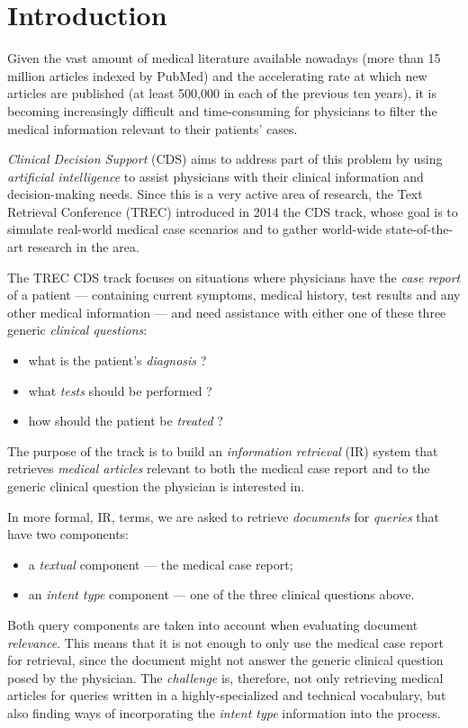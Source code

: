 \chapter{Introduction}
Given the vast amount of medical literature available nowadays (more than 15 million articles indexed by PubMed)
and the accelerating rate at which new articles are published (at least 500,000 in each of the previous ten years),
it is becoming increasingly difficult and time-consuming for physicians to filter the medical information
relevant to their patients' cases.

\emph{Clinical Decision Support} (CDS) aims to address part of this problem by using \emph{artificial intelligence}
to assist physicians with their clinical information and decision-making needs.
Since this is a very active area of research,
the Text Retrieval Conference (TREC)
introduced in 2014 the CDS track,
whose goal is to simulate real-world medical case scenarios and to gather world-wide state-of-the-art research in the area.

The TREC CDS track focuses on situations where physicians have the \emph{case report} of a patient
--- containing current symptoms, medical history, test results and any other medical information ---
and need assistance with either one of these three generic
\emph{clinical questions}:
\begin{itemize}[noitemsep,nolistsep]
 \item what is the patient's \emph{diagnosis} ?
 \item what \emph{tests} should be performed ?
 \item how should the patient be \emph{treated} ?\end{itemize}

The purpose of the track is to build an \emph{information retrieval} (IR) system that
retrieves \emph{medical articles} relevant to both the medical
case report and to the generic clinical question the physician is interested in.

In more formal, IR, terms, we are asked to retrieve \emph{documents} for \emph{queries} that have two components:
\begin{itemize}[noitemsep, nolistsep]
 \item a \emph{textual} component --- the medical case report;
 \item an \emph{intent type} component --- one of the three clinical questions above.
\end{itemize}

Both query components are taken into account when evaluating document \emph{relevance}.
This means that it is not enough to only use the medical case report
for retrieval, since the document might not answer the generic clinical question posed by the physician.
The \emph{challenge} is, therefore, not only retrieving medical articles for queries written in a highly-specialized and technical
vocabulary, but also finding ways of incorporating the \emph{intent type} information into the process.

